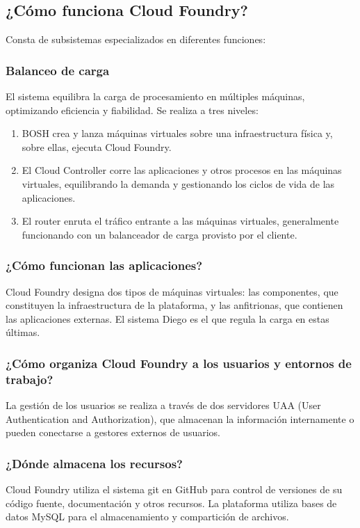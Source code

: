 \documentclass[a4paper,11pt]{article}
\begin{document}
\subsection{¿Cómo funciona Cloud Foundry?}
Consta de subsistemas especializados en diferentes funciones:

\subsubsection{Balanceo de carga}
El sistema equilibra la carga de procesamiento en múltiples máquinas, optimizando eficiencia y fiabilidad. Se realiza a tres niveles:
\begin{enumerate}
  \item BOSH crea y lanza máquinas virtuales sobre una infraestructura física y, sobre ellas, ejecuta Cloud Foundry.
  \item  El Cloud Controller corre las aplicaciones y otros procesos en las máquinas virtuales, equilibrando la demanda y gestionando los ciclos de vida de las aplicaciones.
  \item El router enruta el tráfico entrante a las máquinas virtuales, generalmente funcionando con un balanceador de carga provisto por el cliente.
\end{enumerate}

\subsubsection{¿Cómo funcionan las aplicaciones?}
Cloud Foundry designa dos tipos de máquinas virtuales: las componentes, que constituyen la infraestructura de la plataforma, y las anfitrionas, que contienen las aplicaciones externas. El sistema Diego es el que regula la carga en estas últimas.

\subsubsection{¿Cómo organiza Cloud Foundry a los usuarios y entornos de trabajo?}
La gestión de los usuarios se realiza a través de dos servidores UAA (User Authentication and Authorization), que almacenan la información internamente o pueden conectarse a gestores externos de usuarios.

\subsubsection{¿Dónde almacena los recursos?}
Cloud Foundry utiliza el sistema git en GitHub para control de versiones de su código fuente, documentación y otros recursos. La plataforma utiliza bases de datos MySQL para el almacenamiento y compartición de archivos.
\end{document}
